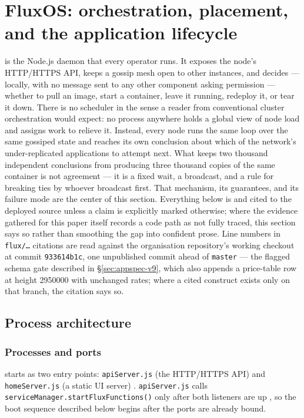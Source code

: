 \section{FluxOS: orchestration, placement, and the application lifecycle}
\label{sec:fluxos}

\FluxOS is the Node.js daemon that every \FluxNode operator runs. It exposes the node's HTTP/HTTPS
API, keeps a gossip mesh open to other \FluxOS instances, and decides — locally, with no message
sent to any other component asking permission — whether to pull an image, start a container, leave
it running, redeploy it, or tear it down. There is no scheduler in the sense a reader from
conventional cluster orchestration would expect: no process anywhere holds a global view of node
load and assigns work to relieve it. Instead, every node runs the same loop over the same
gossiped state and reaches its own conclusion about which of the network's under-replicated
applications to attempt next. What keeps two thousand independent conclusions from producing three
thousand copies of the same container is not agreement — it is a fixed wait, a broadcast, and a
rule for breaking ties by whoever broadcast first. That mechanism, its guarantees, and its failure
mode are the center of this section. Everything below is \shipped and cited to the deployed
\FluxOS source unless a claim is explicitly marked otherwise; where the evidence gathered for this
paper itself records a code path as not fully traced, this section says so rather than smoothing
the gap into confident prose. Line numbers in \texttt{flux/\ldots} citations are read against the
organisation repository's working checkout at commit \texttt{933614b1c}, one unpublished commit
ahead of \texttt{master} --- the flagged  schema gate described in \S\ref{sec:appspec-v9},
which also appends a price-table row at height \num{2950000} with unchanged rates; where a cited
construct exists only on that branch, the citation says so.

\subsection{Process architecture}
\label{sec:fluxos-process}

\subsubsection{Processes and ports}
\FluxOS starts as two entry points: \texttt{apiServer.js} (the HTTP/HTTPS API) and
\texttt{homeServer.js} (a static UI server) . \texttt{apiServer.js}
calls \texttt{serviceManager.\allowbreak{}startFluxFunctions()} only after both listeners are up
, so the boot sequence described below begins after the ports are
already bound.


